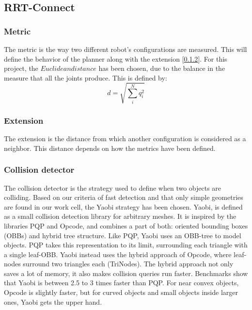 	\subsection{RRT-Connect} %
	\label{sub:rrt_connect_implementation}
	\subsubsection{Metric} %
	\label{sub:metric}
	The metric is the way two different robot's configurations are measured. This will define the behavior of the planner along with the extension [\ref{sub:extension}]. For this project, the $Euclidean distance$ has been chosen, due to the balance in the measure that all the joints produce. This is defined by:
	\begin{equation}
		d=\sqrt{\sum_i^N q_i^2}
	\end{equation}

	\subsubsection{Extension} %
	\label{sub:extension}
	The extension is the distance from which another configuration is considered as a neighbor. This distance depends on how the metrics have been defined.

	\subsubsection{Collision detector} %
	\label{sub:collision_detector}
	The collision detector is the strategy used to define when two objects are colliding. Based on our criteria of fast detection and that only simple geometries are found in our work cell, the Yaobi strategy \cite{Yaobi} has been chosen. Yaobi, is defined as a small collision detection library for arbitrary meshes. It is inspired by the libraries PQP and Opcode, and combines a part of both: oriented bounding boxes (OBBs) and hybrid tree structure. Like PQP, Yaobi uses an OBB-tree to model objects. PQP takes this representation to its limit, surrounding each triangle with a single leaf-OBB. Yaobi instead uses the hybrid approach of Opcode, where leaf-nodes surround two triangles each (TriNodes). The hybrid approach not only saves a lot of memory, it also makes collision queries run faster. Benchmarks show that Yaobi is between 2.5 to 3 times faster than PQP. For near convex objects, Opcode is slightly faster, but for curved objects and small objects inside larger ones, Yaobi gets the upper hand.
